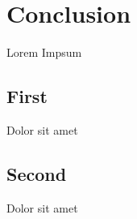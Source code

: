 \section{Conclusion}
Lorem Impsum \cite{dirac}
\subsection{First}
Dolor sit amet
\subsection{Second}
Dolor sit amet